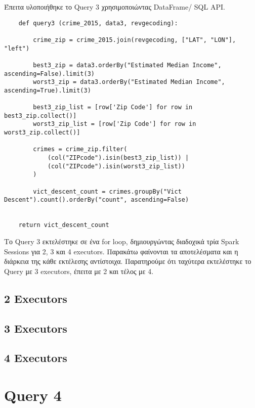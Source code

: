 \documentclass{article}
\begin{document}
Έπειτα υλοποιήθηκε το Query 3 χρησιμοποιώντας DataFrame/ SQL API. 

\begin{lstlisting}
    def query3 (crime_2015, data3, revgecoding):

        crime_zip = crime_2015.join(revgecoding, ["LAT", "LON"], "left")

        best3_zip = data3.orderBy("Estimated Median Income", ascending=False).limit(3)
        worst3_zip = data3.orderBy("Estimated Median Income", ascending=True).limit(3)
        
        best3_zip_list = [row['Zip Code'] for row in best3_zip.collect()] 
        worst3_zip_list = [row['Zip Code'] for row in worst3_zip.collect()]

        crimes = crime_zip.filter(
            (col("ZIPcode").isin(best3_zip_list)) | 
            (col("ZIPcode").isin(worst3_zip_list))
        )
        
        vict_descent_count = crimes.groupBy("Vict Descent").count().orderBy("count", ascending=False)


    return vict_descent_count
\end{lstlisting}

Το Query 3 εκτελέστηκε σε ένα for loop, δημιουργώντας διαδοχικά τρία Spark Sessions για 2, 3 και 4 executors. Παρακάτω φαίνονται τα αποτελέσματα και η διάρκεια της κάθε εκτέλεσης αντίστοιχα. 
Παρατηρούμε ότι ταχύτερα εκτελέστηκε το Query με 3 executors, έπειτα με 2 και τέλος με 4. 
\subsection*{2 Executors}
\subsection*{3 Executors}

\subsection*{4 Executors}

\section{Query 4}
\end{document}

